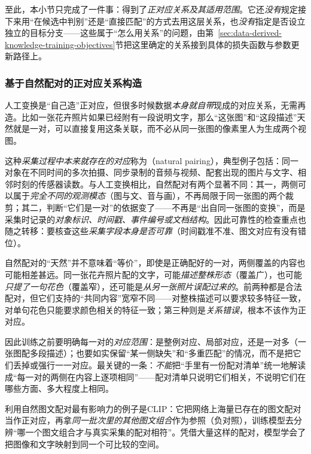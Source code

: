至此，本小节只完成了一件事：得到了\emph{正对应关系及其适用范围}。它还\emph{没有}规定接下来用“在候选中判别”还是“直接匹配”的方式去用这层关系，也\emph{没有}指定是否设立独立的目标分支——这些属于“怎么用关系”的问题，由第~\ref{sec:data-derived-knowledge-training-objectives}节把这里确定的关系接到具体的损失函数与参数更新路径上。

\subsubsection{基于自然配对的正对应关系构造}
\label{sec:data-derived-knowledge-natural-positive}

人工变换是“自己造”正对应，但很多时候数据\emph{本身就自带}现成的对应关系，无需再造。比如一张花卉照片如果已经附有一段说明文字，那么“这张图”和“这段描述”天然就是一对，可以直接复用这条关联，而不必从同一张图的像素里人为生成两个视图。

这种\emph{采集过程中本来就存在的对应}称为（natural pairing），典型例子包括：同一对象在不同时间的多次拍摄、同步录制的音频与视频、配套出现的图片与文字、相邻时刻的传感器读数。与人工变换相比，自然配对有两个显著不同：其一，两侧可以属于\emph{完全不同的观测模态}（图与文、音与画），不再局限于同一张图的两个裁剪；其二，判断“它们是一对”的依据变了——不再是“出自同一张图的变换”，而是采集时记录的\emph{对象标识、时间戳、事件编号或文档结构}。因此可靠性的检查重点也随之转移：要核查这些\emph{采集字段本身是否可靠}（时间戳准不准、图文对应有没有错位）。

自然配对的“天然”并不意味着“等价”，即使是正确配好的一对，两侧覆盖的内容也可能相差甚远。同一张花卉照片配的文字，可能\emph{描述整株形态}（覆盖广），也可能\emph{只提了一句花色}（覆盖窄），还可能是\emph{从另一张照片误配过来的}。前两种都是合法配对，但它们支持的“共同内容”宽窄不同——对整株描述可以要求较多特征一致，对单句花色只能要求颜色相关的特征一致；第三种则是\emph{关系错误}，根本不该作为正对应。

因此训练之前要明确每一对的\emph{对应范围}：是整例对应、局部对应，还是一对多（一张图配多段描述）；也要如实保留“某一侧缺失”和“多重匹配”的情况，而不是把它们丢掉或强行一一对应。最关键的一条：\emph{不能}把“手里有一份配对清单”统一地解读成“每一对的两侧在内容上逐项相同”——配对清单只说明它们相关，不说明它们在哪些方面、多大程度上相同。

\Needspace{65mm}
利用自然图文配对最有影响力的例子是CLIP：它把网络上海量已存在的图文配对当作正对应，再拿\emph{同一批次里的其他图文组合}作为参照（负对照），训练模型去分辨“哪一个图文组合才与真实采集的配对相符”。凭借大量这样的配对，模型学会了把图像和文字映射到同一个可比较的空间。

